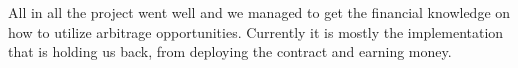 All in all the project went well and we managed to get the financial knowledge
on how to utilize arbitrage opportunities. Currently it is mostly the
implementation that is holding us back, from deploying the contract and earning
money.